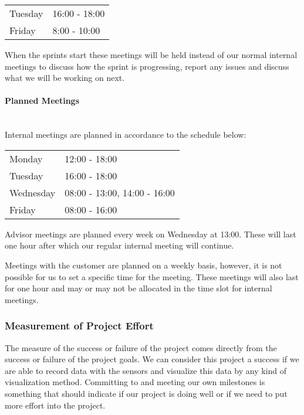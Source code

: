 \documentclass[../document.tex]{subfiles}
\begin{document}
\begin{table}[H]
\begin{tabular}{ll}
\hline
Tuesday	&	16:00 - 18:00 \\
Friday		&	8:00 - 10:00 \\
\hline
\end{tabular}
\end{table}
When the sprints start these meetings will be held instead of our normal internal meetings to discuss how the sprint is progressing, report any issues and discuss what we will be working on next.

\paragraph{Planned Meetings} \ \\
Internal meetings are planned in accordance to the schedule below:

\begin{table}[H]
\begin{tabular}{ll}
\hline
Monday 	&	12:00 - 18:00 \\
Tuesday 	&	16:00 - 18:00 \\
Wednesday 	&	08:00 - 13:00, 14:00 - 16:00 \\
Friday 	&	08:00 - 16:00 \\
\hline
\end{tabular}
\end{table}
Advisor meetings are planned every week on Wednesday at 13:00. These will last one hour after which our regular internal meeting will continue.

Meetings with the customer are planned on a weekly basis, however, it is not possible for us to set a specific time for the meeting. These meetings will also last for one hour and may or may not be allocated in the time slot for internal meetings.

\subsubsection{Measurement of Project Effort}
The measure of the success or failure of the project comes directly from the success or failure of the project goals. We can consider this project a success if we are able to record data with the sensors and visualize this data by any kind of visualization method. Committing to and meeting our own milestones is something that should indicate if our project is doing well or if we need to put more effort into the project.
\end{document}
